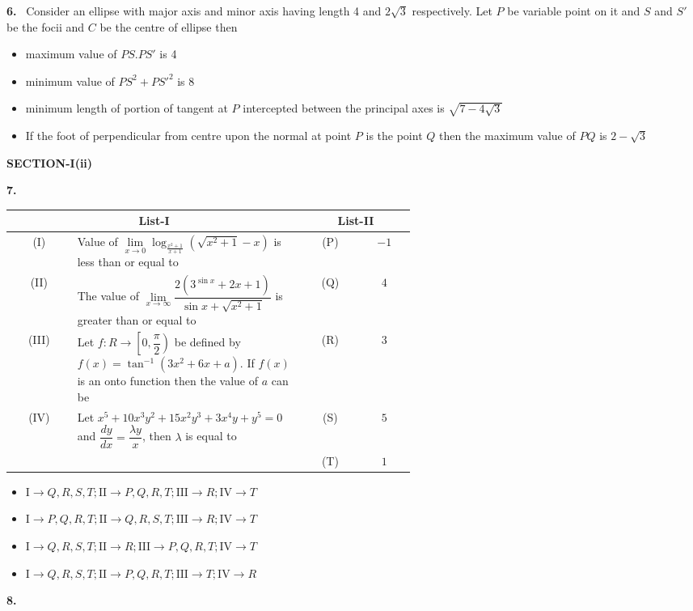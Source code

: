 \documentclass[10pt]{extarticle}
\newcommand{\sect}[1]{\par\smallskip\noindent\textbf{#1}\par}
\newcommand{\qn}[1]{\par\smallskip\noindent\textbf{#1.}~}
\newenvironment{qoptions}{\begin{itemize}[leftmargin=1.8em,itemsep=1pt,topsep=2pt,label={}]}{\end{itemize}}
\newcommand{\opt}[2]{\item[(#1)] #2}
\begin{document}
\begin{multicols}{2}
\qn{6} Consider an ellipse with major axis and minor axis having length 4 and $2\sqrt3$ respectively. Let $P$ be variable point on it and $S$ and $S'$ be the focii and $C$ be the centre of ellipse then
\begin{qoptions}
\opt{A}{maximum value of $PS.PS'$ is 4}
\opt{B}{minimum value of $PS^2+PS'^2$ is 8}
\opt{C}{minimum length of portion of tangent at $P$ intercepted between the principal axes is $\sqrt{7-4\sqrt3}$}
\opt{D}{If the foot of perpendicular from centre upon the normal at point $P$ is the point $Q$ then the maximum value of $PQ$ is $2-\sqrt3$}
\end{qoptions}
\sect{SECTION-I(ii)}
\qn{7}
{\small\setlength{\tabcolsep}{2pt}\begin{tabular}{|c|p{0.58\linewidth}|c|c|}
\hline
\multicolumn{2}{|c|}{\textbf{List-I}} & \multicolumn{2}{c|}{\textbf{List-II}}\\ \hline
(I) & Value of $\lim\limits_{x\to0}\log_{\frac{x^2+1}{x+1}}\left(\sqrt{x^2+1}-x\right)$ is less than or equal to & (P) & $-1$\\ \hline
(II) & The value of $\lim\limits_{x\to\infty}\dfrac{2\left(3^{\sin x}+2x+1\right)}{\sin x+\sqrt{x^2+1}}$ is greater than or equal to & (Q) & $4$\\ \hline
(III) & Let $f:R\to\left[0,\dfrac\pi2\right)$ be defined by $f(x)=\tan^{-1}\left(3x^2+6x+a\right)$. If $f(x)$ is an onto function then the value of $a$ can be & (R) & $3$\\ \hline
(IV) & Let $x^5+10x^3y^2+15x^2y^3+3x^4y+y^5=0$ and $\dfrac{dy}{dx}=\dfrac{\lambda y}x$, then $\lambda$ is equal to & (S) & $5$\\ \hline
 & & (T) & $1$\\ \hline
\end{tabular}}\par
\begin{qoptions}
\opt{A}{$\mathrm I\to Q,R,S,T;\allowbreak \mathrm{II}\to P,Q,R,T;\allowbreak \mathrm{III}\to R;\allowbreak \mathrm{IV}\to T$}
\opt{B}{$\mathrm I\to P,Q,R,T;\allowbreak \mathrm{II}\to Q,R,S,T;\allowbreak \mathrm{III}\to R;\allowbreak \mathrm{IV}\to T$}
\opt{C}{$\mathrm I\to Q,R,S,T;\allowbreak \mathrm{II}\to R;\allowbreak \mathrm{III}\to P,Q,R,T;\allowbreak \mathrm{IV}\to T$}
\opt{D}{$\mathrm I\to Q,R,S,T;\allowbreak \mathrm{II}\to P,Q,R,T;\allowbreak \mathrm{III}\to T;\allowbreak \mathrm{IV}\to R$}
\end{qoptions}
\qn{8}
{\footnotesize\setlength{\tabcolsep}{2pt}\begin{tabular}{|c|p{0.34\linewidth}|c|p{0.27\linewidth}|}

\end{tabular}}
\end{multicols}
\end{document}
